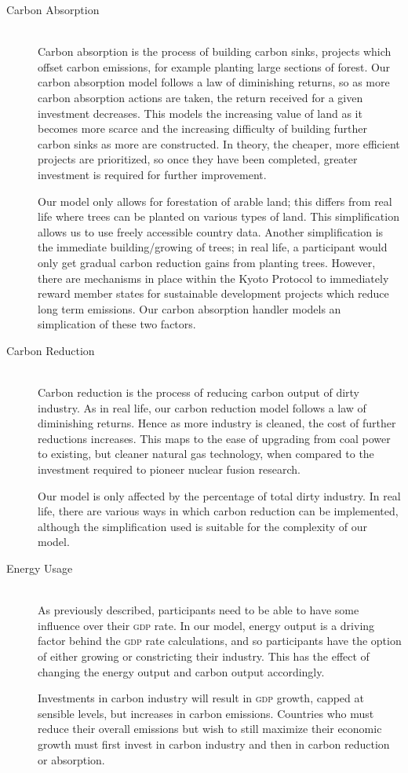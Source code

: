 \begin{description}
\item [Carbon Absorption] \hfill \\ 
Carbon absorption is the process of building carbon sinks, projects which offset carbon emissions, for example planting large sections of forest. Our carbon absorption model follows a law of diminishing returns, so as more carbon absorption actions are taken, the return received for a given investment decreases. This models the increasing value of land as it becomes more scarce and the increasing difficulty of building further carbon sinks as more are constructed. In theory, the cheaper, more efficient projects are prioritized, so once they have been completed, greater investment is required for further improvement.

Our model only allows for forestation of arable land; this differs from real life where trees can be planted on various types of land. This simplification allows us to use freely accessible country data. Another simplification is the immediate building/growing of trees; in real life, a participant would only get gradual carbon reduction gains from planting trees. However, there are mechanisms in place within the Kyoto Protocol to immediately reward member states for sustainable development projects which reduce long term emissions. Our carbon absorption handler models an simplication of these two factors. 

\item [Carbon Reduction] \hfill \\ 
Carbon reduction is the process of reducing carbon output of dirty industry. As in real life, our carbon reduction model follows a law of diminishing returns. Hence as more industry is cleaned, the cost of further reductions increases. This maps to the ease of upgrading from coal power to existing, but cleaner natural gas technology, when compared to the investment required to pioneer nuclear fusion research.

Our model is only affected by the percentage of total dirty industry. In real life, there are various ways in which carbon reduction can be implemented, although the simplification used is suitable for the complexity of our model.

\item [Energy Usage] \hfill \\ 
As previously described, participants need to be able to have some influence over their \textsc{gdp} rate. In our model, energy output is a driving factor behind the \textsc{gdp} rate calculations, and so participants have the option of either growing or constricting their industry. This has the effect of changing the energy output and carbon output accordingly.

Investments in carbon industry will result in \textsc{gdp} growth, capped at sensible levels, but increases in carbon emissions. Countries who must reduce their overall emissions but wish to still maximize their economic growth must first invest in carbon industry and then in carbon reduction or absorption.
\end{description}


